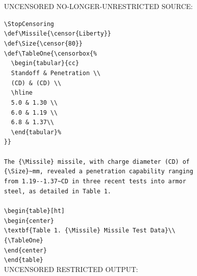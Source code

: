 \documentclass{article}
\begin{document}
{\addtolength{\leftskip}{2.3em}
UNCENSORED NO-LONGER-UNRESTRICTED SOURCE: \hrulefill

\verb|\StopCensoring|\\
\verb|\def\Missile{\censor{Liberty}}|\\
\verb|\def\Size{\censor{80}}|\\
\verb|\def\TableOne{\censorbox{%|\\
\verb|  \begin{tabular}{cc}|\\
\verb|  Standoff & Penetration \\|\\
\verb|  (CD) & (CD) \\|\\
\verb|  \hline|\\
\verb|  5.0 & 1.30 \\|\\
\verb|  6.0 & 1.19 \\|\\
\verb|  6.8 & 1.37\\|\\
\verb|  \end{tabular}%|\\
\verb|}}|\\
\verb||\\
\verb|The {\Missile} missile, with charge diameter (CD) of|\\
\verb|{\Size}~mm, revealed a penetration capability ranging|\\
\verb|from 1.19--1.37~CD in three recent tests into armor|\\
\verb|steel, as detailed in Table 1.|\\
\verb||\\
\verb|\begin{table}[ht]|\\
\verb|\begin{center}|\\
\verb|\textbf{Table 1. {\Missile} Missile Test Data}\\|\\
\verb|{\TableOne}|\\
\verb|\end{center}|\\
\verb|\end{table}|\\

UNCENSORED RESTRICTED OUTPUT: \hrulefill

\StopCensoring

\def\Missile{\censor{Liberty}}
\def\Size{\censor{80}}
\def\TableOne{\censorbox{%
  \begin{tabular}{cc}
  Standoff & Penetration \\
  (CD) & (CD) \\
  \hline
  5.0 & 1.30 \\
  6.0 & 1.19 \\
  6.8 & 1.37\\
  \end{tabular}%
}}

}
\end{document}
